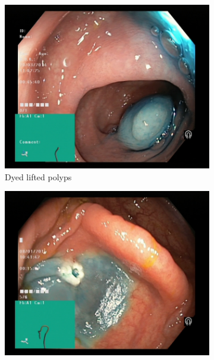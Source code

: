     \begin{figure}
        \centering
        \begin{subfigure}[b]{0.4\textwidth}
            \centering
            \includegraphics[width=\textwidth]{experiments/images/dyed-lifted-polyps.jpg}
            \caption{{\small Dyed lifted polyps }}    
            \label{fig:kvasir-dyed-lifted-polyps}
        \end{subfigure}
        \qquad
        \begin{subfigure}[b]{0.4\textwidth}  
            \centering 
            \includegraphics[width=\textwidth]{experiments/images/dyed-resection-margins.jpg}

\end{subfigure}
\end{figure}
